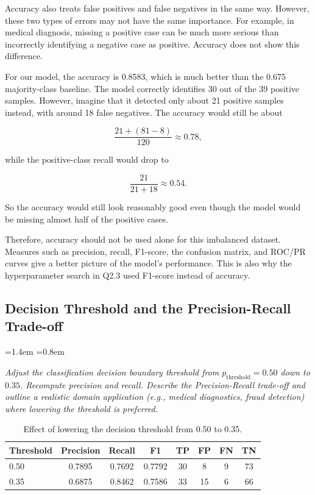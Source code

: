 \documentclass[12pt,a4paper]{article}
\newcommand{\qtext}[1]{%
  \begin{list}{}{\leftmargin=1.4em \rightmargin=0.8em
                 \topsep=3pt \parsep=0pt \itemsep=0pt}
  \item[]\itshape #1
  \end{list}}
\begin{document}
Accuracy also treats false positives and false negatives in the same way. However, these two types
of errors may not have the same importance. For example, in medical diagnosis, missing a positive
case can be much more serious than incorrectly identifying a negative case as positive. Accuracy
does not show this difference.

For our model, the accuracy is 0.8583, which is much better than the 0.675 majority-class
baseline. The model correctly identifies 30 out of the 39 positive samples. However, imagine that
it detected only about 21 positive samples instead, with around 18 false negatives. The accuracy
would still be about

\begin{equation*}
\frac{21+(81-8)}{120} \approx 0.78,
\end{equation*}

while the positive-class recall would drop to

\begin{equation*}
\frac{21}{21+18} \approx 0.54.
\end{equation*}

So the accuracy would still look reasonably good even though the model would be missing almost
half of the positive cases.

Therefore, accuracy should not be used alone for this imbalanced dataset. Measures such as
precision, recall, F1-score, the confusion matrix, and ROC/PR curves give a better picture of the
model's performance. This is also why the hyperparameter search in Q2.3 used F1-score instead of
accuracy.

\subsection{Decision Threshold and the Precision-Recall Trade-off}

\qtext{Adjust the classification decision boundary threshold from $p_{\text{threshold}} = 0.50$
down to $0.35$. Recompute precision and recall. Describe the Precision-Recall trade-off and
outline a realistic domain application (e.g., medical diagnostics, fraud detection) where lowering
the threshold is preferred.}



\begin{table}[H]
\centering
\caption{Effect of lowering the decision threshold from 0.50 to 0.35.}
\label{tab:thresh}
\begin{tabular}{lccccccc}
\toprule
\textbf{Threshold} & \textbf{Precision} & \textbf{Recall} & \textbf{F1}
& \textbf{TP} & \textbf{FP} & \textbf{FN} & \textbf{TN} \\
\midrule
0.50 & 0.7895 & 0.7692 & 0.7792 & 30 & 8  & 9 & 73 \\
0.35 & 0.6875 & 0.8462 & 0.7586 & 33 & 15 & 6 & 66 \\
\bottomrule
\end{tabular}
\end{table}
\end{document}
